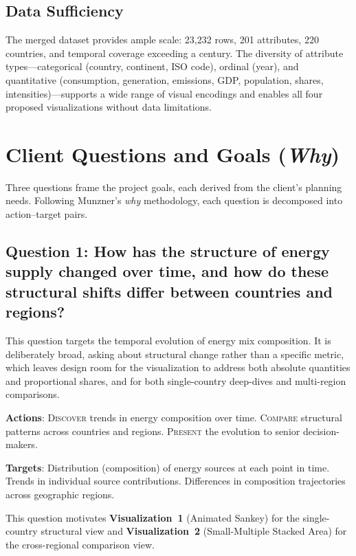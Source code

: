 \documentclass[10pt]{article}
\begin{document}
\subsection{Data Sufficiency}

The merged dataset provides ample scale: 23{,}232 rows, 201 attributes, 220 countries, and temporal coverage exceeding a century. The diversity of attribute types---categorical (country, continent, ISO code), ordinal (year), and quantitative (consumption, generation, emissions, GDP, population, shares, intensities)---supports a wide range of visual encodings and enables all four proposed visualizations without data limitations.


\section{Client Questions and Goals (\emph{Why})}
\label{sec:why}

Three questions frame the project goals, each derived from the client's planning needs. Following Munzner's \emph{why} methodology, each question is decomposed into action--target pairs.

\subsection{Question 1: How has the structure of energy supply changed over time, and how do these structural shifts differ between countries and regions?}

This question targets the temporal evolution of energy mix composition. It is deliberately broad, asking about structural change rather than a specific metric, which leaves design room for the visualization to address both absolute quantities and proportional shares, and for both single-country deep-dives and multi-region comparisons.

\textbf{Actions}: \textsc{Discover} trends in energy composition over time. \textsc{Compare} structural patterns across countries and regions. \textsc{Present} the evolution to senior decision-makers.

\textbf{Targets}: Distribution (composition) of energy sources at each point in time. Trends in individual source contributions. Differences in composition trajectories across geographic regions.

This question motivates \textbf{Visualization~1} (Animated Sankey) for the single-country structural view and \textbf{Visualization~2} (Small-Multiple Stacked Area) for the cross-regional comparison view.
\end{document}
